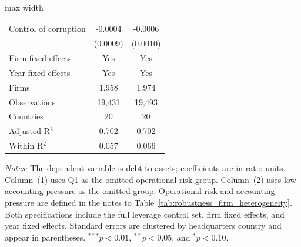 \begin{table}[htbp]
\begin{adjustbox}{max width=\textwidth}
\begin{tabular}{lcc}
      Control of corruption       & -0.0004                     & -0.0006 \\
                                  & (0.0009)                    & (0.0010) \\
      \midrule
      Firm fixed effects          & Yes                         & Yes \\
      Year fixed effects          & Yes                         & Yes \\
      Firms                       & 1,958                       & 1,974 \\
      Observations                & 19,431                      & 19,493 \\
      Countries                   & 20                          & 20 \\
      Adjusted R$^2$              & 0.702                       & 0.702 \\
      Within R$^2$                & 0.057                       & 0.066 \\
      \bottomrule
   \end{tabular}
   \end{adjustbox}
   \parbox{\textwidth}{\vspace{0.35em}\fontsize{6.5pt}{7.3pt}\selectfont\textit{Notes:} The dependent variable is debt-to-assets; coefficients are in ratio units. Column~(1) uses Q1 as the omitted operational-risk group. Column~(2) uses low accounting pressure as the omitted group. Operational risk and accounting pressure are defined in the notes to Table~\ref{tab:robustness_firm_heterogeneity}. Both specifications include the full leverage control set, firm fixed effects, and year fixed effects. Standard errors are clustered by headquarters country and appear in parentheses. $^{***}p<0.01$, $^{**}p<0.05$, and $^{*}p<0.10$.}
\end{table}
